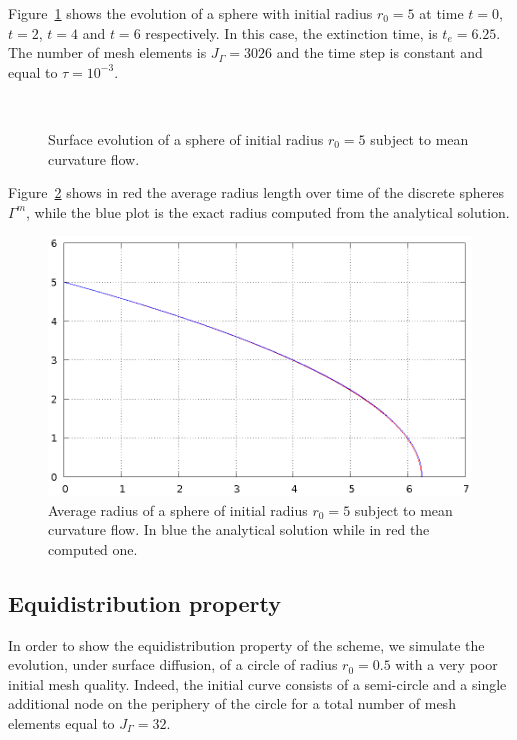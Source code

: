 Figure~\ref{fig:mcf_sphere} shows the evolution of a sphere with initial radius
$r_0=5$ at time $t=0$, $t=2$, $t=4$ and $t=6$ respectively. In this case, the
extinction time, is $t_e=6.25$. The number of mesh elements is $J_\Gamma=3026$
and the time step is constant and equal to $\tau=10^{-3}$.

\begin{figure}[htbp]
\centering
{}
\\
\caption[Mean curvature flow shrinking sphere]{Surface evolution of a sphere of
initial radius $r_0=5$ subject to mean curvature flow.}
\label{fig:mcf_sphere}
\end{figure}

Figure~\ref{fig:mcf_sphere_radius} shows in red the average radius length
over time of the discrete spheres $\Gamma^m$, while the blue plot is the exact
radius computed from the analytical solution.

\begin{figure}[htbp]
\centering
\includegraphics[width=.45\textwidth]
{figures/geometric_pdes/mcf_sphere_radius.ps}
\caption[Mean curvature flow shrinking sphere radius]{Average radius of a
sphere of initial radius $r_0=5$ subject to mean curvature flow. In blue the
analytical solution while in red the computed one.}
\label{fig:mcf_sphere_radius}
\end{figure}

\subsection{Equidistribution property}\label{subsec:sd_circle}
In order to show the equidistribution property of the scheme, we simulate the
evolution, under surface diffusion, of a circle of radius $r_0=0.5$ with a very
poor initial mesh quality. Indeed, the initial curve consists of a semi-circle
and a single additional node on the periphery of the circle for a total number
of mesh elements equal to $J_\Gamma=32$.

